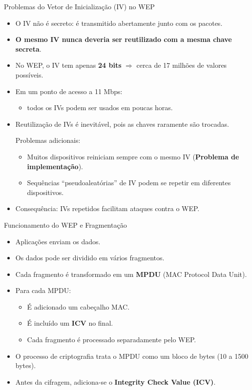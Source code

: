 \begin{frame}{Problemas do Vetor de Inicialização (IV) no WEP}
    \begin{itemize}
        \item O IV não é secreto: é transmitido abertamente junto com os pacotes.
        \item \textbf{O mesmo IV nunca deveria ser reutilizado com a mesma chave secreta}.
        \item No WEP, o IV tem apenas \textbf{24 bits} $\Rightarrow$ cerca de 17 milhões de valores possíveis.
        \item Em um ponto de acesso a 11 Mbps:
              \begin{itemize}
                  \item todos os IVs podem ser usados em poucas horas.
              \end{itemize}
        \item Reutilização de IVs é inevitável, pois as chaves raramente são trocadas.
              \begin{block}{Problemas adicionais:}
                  \begin{itemize}
                      \item Muitos dispositivos reiniciam sempre com o mesmo IV (\textbf{Problema de implementação}).
                      \item Sequências “pseudoaleatórias” de IV podem se repetir em diferentes dispositivos.
                  \end{itemize}
              \end{block}

        \item Consequência: IVs repetidos facilitam ataques contra o WEP.
    \end{itemize}
\end{frame}

\begin{frame}{Funcionamento do WEP e Fragmentação}
    \begin{itemize}
        \item Aplicações enviam os dados.
        \item Os dados pode ser dividido em vários fragmentos.
        \item Cada fragmento é transformado em um \textbf{MPDU} (MAC Protocol Data Unit).
        \item Para cada MPDU:
              \begin{itemize}
                  \item É adicionado um cabeçalho MAC.
                  \item É incluído um \textbf{ICV} no final.
                  \item Cada fragmento é processado separadamente pelo WEP.
              \end{itemize}
        \item O processo de criptografia trata o MPDU como um bloco de bytes (10 a 1500 bytes).
        \item Antes da cifragem, adiciona-se o \textbf{Integrity Check Value (ICV)}.
    \end{itemize}
\end{frame}

